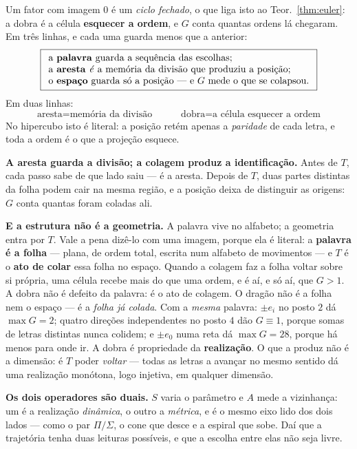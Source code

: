 \documentclass[11pt,a4paper]{article}
\begin{document}
\medskip\noindent Um fator com imagem $0$ é um \emph{ciclo fechado}, o que liga
isto ao Teor.~\ref{thm:euler}: a dobra é a célula \textbf{esquecer a ordem}, e
$G$ conta quantas ordens lá chegaram. Em três linhas, e cada uma guarda menos
que a anterior:
\[
\boxed{
\begin{array}{l}
\text{a \textbf{palavra} guarda a sequência das escolhas;}\\
\text{a \textbf{aresta} \emph{é} a memória da divisão que produziu a posição;}\\
\text{o \textbf{espaço} guarda só a posição --- e }G\text{ mede o que se colapsou.}
\end{array}}
\]
Em duas linhas:
\[
\boxed{\ \text{aresta}=\text{memória da divisão}\ }
\qquad
\boxed{\ \text{dobra}=\text{a célula esquecer a ordem}\ }
\]
No hipercubo isto é literal: a posição retém apenas a \emph{paridade} de cada
letra, e toda a ordem é o que a projeção esquece.

\medskip\noindent\textbf{A aresta guarda a divisão; a colagem produz a
identificação.} Antes de $T$, cada passo sabe de que lado saiu --- é a aresta.
Depois de $T$, duas partes distintas da folha podem cair na mesma região, e a
posição deixa de distinguir as origens: $G$ conta quantas foram coladas ali.

\medskip\noindent\textbf{E a estrutura não é a geometria.} A palavra vive no
alfabeto; a geometria entra por $T$. Vale a pena dizê-lo com uma imagem, porque
ela é literal: a \textbf{palavra é a folha} --- plana, de ordem total, escrita
num alfabeto de movimentos --- e $T$ é o \textbf{ato de colar} essa folha no
espaço. Quando a colagem faz a folha voltar sobre si própria, uma célula recebe
mais do que uma ordem, e é aí, e só aí, que $G>1$. A dobra não é defeito da
palavra: é o ato de colagem. O dragão não é a folha nem o espaço --- é a
\emph{folha já colada}. Com a \emph{mesma} palavra: $\pm e_i$ no posto $2$ dá $\max G=2$; quatro direções independentes no posto $4$ dão $G\equiv1$,
porque somas de letras distintas nunca colidem; e $\pm e_0$ numa reta dá
$\max G=28$, porque há menos para onde ir. A dobra é propriedade da
\textbf{realização}. O que a produz não é a dimensão: é $T$ poder \emph{voltar}
--- todas as letras a avançar no mesmo sentido dá uma realização monótona, logo
injetiva, em qualquer dimensão.

\medskip\noindent\textbf{Os dois operadores são duais.} $S$ varia o parâmetro e
$A$ mede a vizinhança: um é a realização \emph{dinâmica}, o outro a
\emph{métrica}, e é o mesmo eixo lido dos dois lados --- como o par
$\Pi/\Sigma$, o cone que desce e a espiral que sobe. Daí que a trajetória tenha
duas leituras possíveis, e que a escolha entre elas não seja livre.
\end{document}
